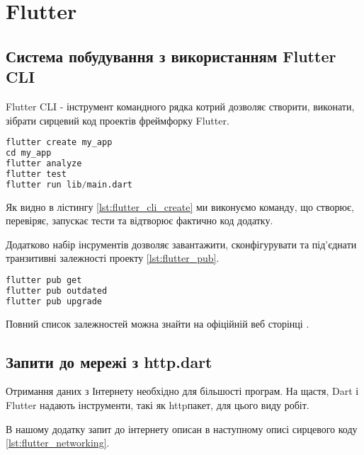 \chapter{Flutter}
\label{ch3}

\section{Система побудування з використанням Flutter CLI}
\label{section.3.2}
Flutter CLI - інструмент командного рядка котрий дозволяє створити, виконати, зібрати сирцевий код проектів фреймфорку Flutter.

\begin{lstlisting}[style=light, language=Python,label={lst:flutter_cli_create},caption=Flutter Create Project]
flutter create my_app
cd my_app
flutter analyze
flutter test
flutter run lib/main.dart
\end{lstlisting}

Як видно в лістингу \ref{lst:flutter_cli_create} ми виконуємо команду, що створює, перевіряє, запускає тести та відтворює фактично код додатку.

Додатково набір інсрументів дозволяє завантажити, сконфігурувати та під'єднати транзитивні залежності проекту \ref{lst:flutter_pub}.
\begin{lstlisting}[style=light, language=Python,label={lst:flutter_pub},caption=Flutter Dependency Resolution]
flutter pub get
flutter pub outdated
flutter pub upgrade
\end{lstlisting}

Повний список залежностей можна знайти на офіційній веб сторінці \cite{flutter_cli}.


\section{Запити до мережі з http.dart}
\label{section.3.3}
Отримання даних з Інтернету необхідно для більшості програм. На щастя, Dart і Flutter надають інструменти, такі як httpпакет, для цього виду робіт.

В нашому додатку запит до інтернету описан в наступному описі сирцевого коду \ref{lst:flutter_networking}.

